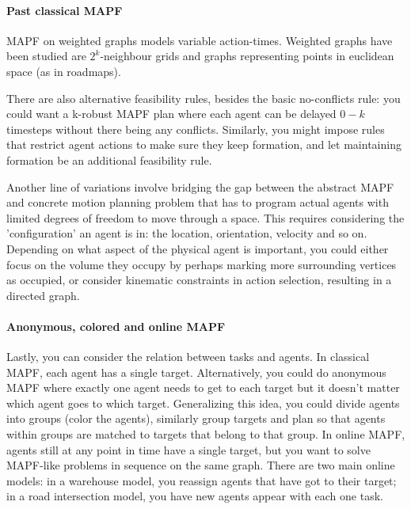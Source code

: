 \documentclass[a4paper,10pt,english]{article}
\begin{document}
	\paragraph{Past classical MAPF}
	MAPF on weighted graphs models variable action-times. Weighted graphs have been studied are $2^k$-neighbour grids and graphs representing points in euclidean space (as in roadmaps).
	
	There are also alternative feasibility rules, besides the basic no-conflicts rule: you could want a k-robust MAPF plan where each agent can be delayed $0-k$ timesteps without there being any conflicts. Similarly, you might impose rules that restrict agent actions to make sure they keep formation, and let maintaining formation be an additional feasibility rule. 
	
	Another line of variations involve bridging the gap between the abstract MAPF and concrete motion planning problem that has to program actual agents with limited degrees of freedom to move through a space. This requires considering the 'configuration' an agent is in: the location, orientation, velocity and so on. Depending on what aspect of the physical agent is important, you could either focus on the volume they occupy by perhaps marking more surrounding vertices as occupied, or consider kinematic constraints in action selection, resulting in a directed graph.
	\paragraph{Anonymous, colored and online MAPF}
	Lastly, you can consider the relation between tasks and agents. In classical MAPF, each agent has a single target. Alternatively, you could do anonymous MAPF where exactly one agent needs to get to each target but it doesn't matter which agent goes to which target. Generalizing this idea, you could divide agents into groups (color the agents), similarly group targets and plan so that agents within groups are matched to targets that belong to that group. In online MAPF, agents still at any point in time have a single target, but you want to solve MAPF-like problems in sequence on the same graph. There are two main online models: in a warehouse model, you reassign agents that have got to their target; in a road intersection model, you have new agents appear with each one task.  
\end{document}

